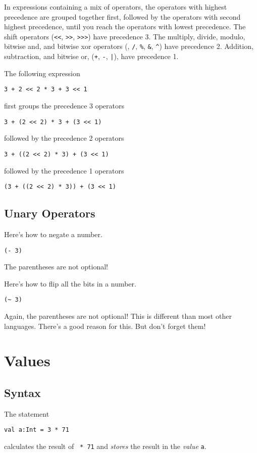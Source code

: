 \documentclass[10pt,oneside]{book}
\begin{document}
In expressions containing a mix of operators, the operators with highest precedence are grouped together first, followed by the operators with second highest precedence, until you reach the operators with lowest precedence. The shift operators (\texttt{\frenchspacing <<}, \texttt{\frenchspacing >>}, \texttt{\frenchspacing >>>}) have precedence 3. The multiply, divide, modulo, bitwise and, and bitwise xor operators (\texttt{\frenchspacing *}, \texttt{\frenchspacing /}, \texttt{\frenchspacing \%}, \texttt{\frenchspacing \&}, \texttt{\frenchspacing \^}) have precedence 2. Addition, subtraction, and bitwise or, (\texttt{\frenchspacing +}, \texttt{\frenchspacing -}, \texttt{\frenchspacing |}), have precedence 1.

The following expression
\begin{lstlisting}
3 + 2 << 2 * 3 + 3 << 1
\end{lstlisting}
first groups the precedence 3 operators
\begin{lstlisting}
3 + (2 << 2) * 3 + (3 << 1)
\end{lstlisting}
followed by the precedence 2 operators
\begin{lstlisting}
3 + ((2 << 2) * 3) + (3 << 1)
\end{lstlisting}
followed by the precedence 1 operators
\begin{lstlisting}
(3 + ((2 << 2) * 3)) + (3 << 1)
\end{lstlisting}

\subsection*{Unary Operators}
Here's how to negate a number.
\begin{lstlisting}
(- 3)
\end{lstlisting}
The parentheses are not optional! 

Here's how to flip all the bits in a number.
\begin{lstlisting}
(~ 3)
\end{lstlisting}
Again, the parentheses are not optional! This is different than most other languages. There's a good reason for this. But don't forget them!  

\section{Values}
\subsection*{Syntax}
The statement
\begin{lstlisting}
val a:Int = 3 * 71
\end{lstlisting}
calculates the result of \texttt{ * 71} and {\em stores} the result in the {\em value} \texttt{\frenchspacing a}. 
\end{document}
